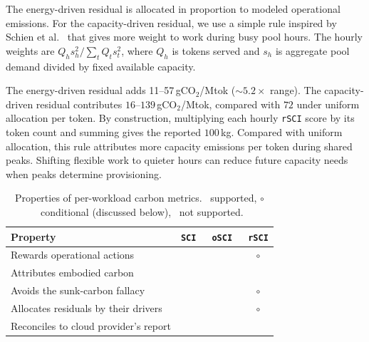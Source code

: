 \documentclass[sigconf]{acmart}
\newcommand{\SCI}{\texttt{SCI}\xspace}
\newcommand{\RSCI}{\texttt{rSCI}\xspace}
\newcommand{\OSCI}{\texttt{oSCI}\xspace}
\newcommand{\faithful}{\textcolor[HTML]{1a7f37}{\ding{51}}}
\newcommand{\conditional}{\textcolor[HTML]{1a7f37}{\ensuremath{\circ}}}
\newcommand{\notrefl}{\textcolor[HTML]{d1242f}{\ding{55}}}
\begin{document}
The energy-driven residual is allocated in proportion to modeled operational emissions.
For the capacity-driven residual, we use a simple rule inspired by Schien et al.~\cite{schien2025causal} that gives more weight to work during busy pool hours.
The hourly weights are $Q_h s_h^2/\sum_t Q_t s_t^2$, where $Q_h$ is tokens served and $s_h$ is aggregate pool demand divided by fixed available capacity.

The energy-driven residual adds 11--57\,gCO$_2$/Mtok (${\sim}5.2\times$ range).
The capacity-driven residual contributes $16$--$139$\,gCO$_2$/Mtok, compared with $72$ under uniform allocation per token.
By construction, multiplying each hourly \RSCI score by its token count and summing gives the reported $100$\,kg.
Compared with uniform allocation, this rule attributes more capacity emissions per token during shared peaks.
Shifting flexible work to quieter hours can reduce future capacity needs when peaks determine provisioning.

\begin{table}[t]
\centering
\small
\caption{Properties of per-workload carbon metrics. \faithful~supported, \conditional~conditional (discussed below), \notrefl~not supported.}
\vspace{-3mm}
\label{tab:properties}
\begin{tabularx}{\columnwidth}{@{}X ccc@{}}
\toprule
\textbf{Property} & \textbf{\SCI}~\cite{sci-spec} & \textbf{\OSCI}~\cite{bashir2024} & \textbf{\RSCI} \\
\midrule
Rewards operational actions & \faithful & \faithful & \conditional \\
Attributes embodied carbon & \faithful & \notrefl & \faithful \\
Avoids the sunk-carbon fallacy~\cite{bashir2024} & \notrefl & \faithful & \conditional \\
Allocates residuals by their drivers & \notrefl & \notrefl & \conditional \\
Reconciles to cloud provider's report & \notrefl & \notrefl & \faithful \\
\bottomrule
\end{tabularx}
\vspace{-3mm}
\end{table}
\end{document}
